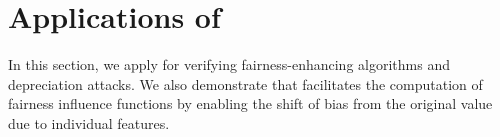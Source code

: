 \section{Applications of {\fvgm}}\label{fvgm_sec:applications}
In this section, we apply {\fvgm} for verifying fairness-enhancing algorithms and depreciation attacks. We also demonstrate that {\fvgm} facilitates the computation of fairness influence functions by enabling the shift of bias from the original value due to individual features. 

